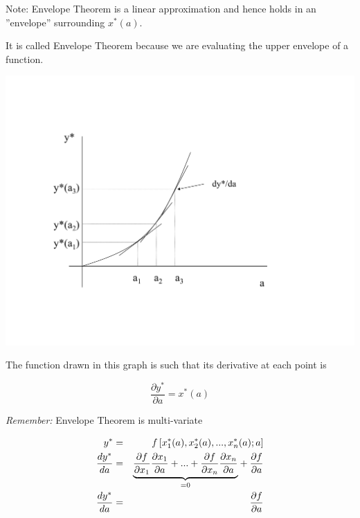 \documentclass[11pt,english]{article}
\begin{document}
Note: Envelope Theorem is a linear approximation and hence holds in an
''envelope'' surrounding $x^{\ast }(a)$.

It is called Envelope Theorem because we are evaluating the upper envelope
of a function.

\includegraphics[scale=0.6]{math10.pdf}


\bigskip

The function drawn in this graph is such that its derivative at each point is

\begin{equation*}
\frac{\partial y^{\ast }}{\partial a}=x^{\ast }(a)
\end{equation*}

\begin{center}
\bigskip
\end{center}

\textit{Remember: }Envelope Theorem is multi-variate

\begin{eqnarray*}
y^{\ast } &=&f\left[ x_{1}^{\ast }(a),x_{2}^{\ast }(a),...,x_{n}^{\ast }(a);a%
\right] \\
\frac{dy^{\ast }}{da} &=&\underset{=0}{\underbrace{\frac{\partial f}{%
\partial x_{1}}\frac{\partial x_{1}}{\partial a}+...+\frac{\partial f}{%
\partial x_{n}}\frac{\partial x_{n}}{\partial a}}}+\frac{\partial f}{%
\partial a} \\
\frac{dy^{\ast }}{da} &=&\frac{\partial f}{\partial a}
\end{eqnarray*}

\bigskip
\end{document}
